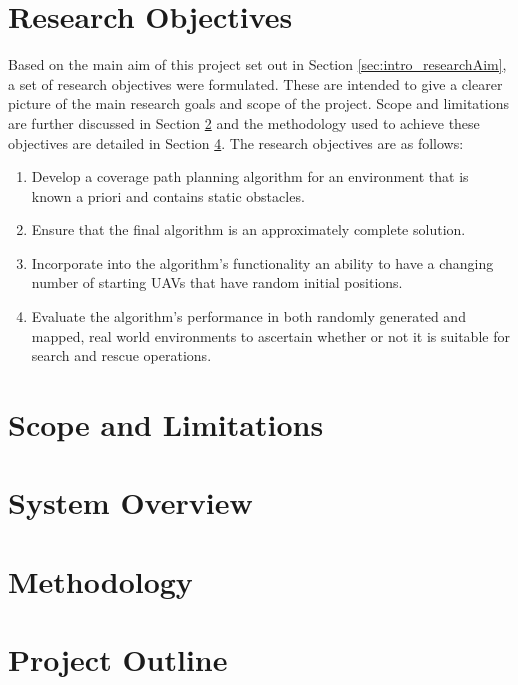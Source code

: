 \section{Research Objectives}
\label{sec:intro_Objectives}
Based on the main aim of this project set out in Section \ref{sec:intro_researchAim}, a set of research objectives were formulated. These are intended to give a clearer picture of the main research goals and scope of the project. Scope and limitations are further discussed in Section \ref{sec:intro_scope} and the methodology used to achieve these objectives are detailed in Section \ref{sec:intro_method}. The research objectives are as follows:
\begin{enumerate}
	\item Develop a coverage path planning algorithm for an environment that is known a priori and contains static obstacles.
	\item Ensure that the final algorithm is an approximately complete solution.
	\item Incorporate into the algorithm's functionality an ability to have a changing number of starting UAVs that have random initial positions.
	\item Evaluate the algorithm's performance in both randomly generated and mapped, real world environments to ascertain whether or not it is suitable for search and rescue operations.
\end{enumerate}

\section{Scope and Limitations}
\label{sec:intro_scope}
\section{System Overview}

\section{Methodology}
\label{sec:intro_method}

\section{Project Outline}
\label{sec:intro_struct}
